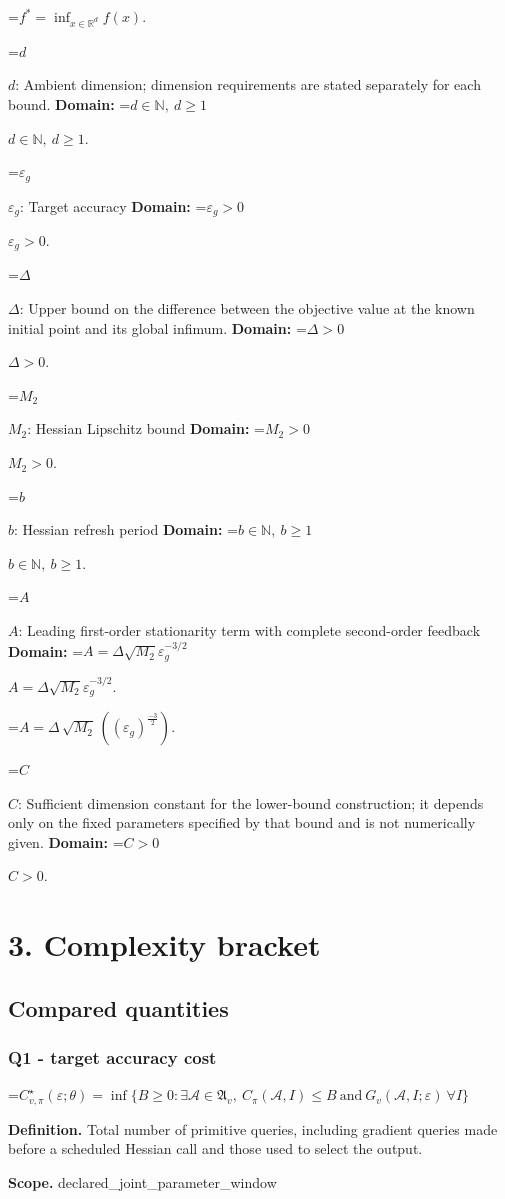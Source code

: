 \documentclass[10pt,a4paper]{article}
\newcommand{\AtlasMath}[1]{\par\begingroup\centering\setbox0=\hbox{$\displaystyle #1$}\ifdim\wd0>1.4\linewidth\typeout{ATLAS WIDE FORMULA: \the\wd0}\fi\ifdim\wd0>\linewidth\resizebox{\linewidth}{!}{\box0}\else\box0\fi\par\endgroup}
\newcommand{\AtlasInlineMath}[1]{\begingroup\setbox0=\hbox{$#1$}\ifdim\wd0>.4\linewidth\endgroup\AtlasMath{#1}\else\endgroup$#1$\fi}
\begin{document}
\AtlasMath{f^*=\inf_{x\in \mathbb{R}^d}f(x).}


\AtlasInlineMath{d}: Ambient dimension; dimension requirements are stated separately for each bound. \textbf{Domain:} \AtlasInlineMath{d\in\mathbb{N},\ d\ge1}.

\AtlasInlineMath{\varepsilon_g}: Target accuracy \textbf{Domain:} \AtlasInlineMath{\varepsilon_g>0}.

\AtlasInlineMath{\Delta}: Upper bound on the difference between the objective value at the known initial point and its global infimum. \textbf{Domain:} \AtlasInlineMath{\Delta>0}.

\AtlasInlineMath{M_2}: Hessian Lipschitz bound \textbf{Domain:} \AtlasInlineMath{M_2>0}.

\AtlasInlineMath{b}: Hessian refresh period \textbf{Domain:} \AtlasInlineMath{b\in\mathbb{N},\ b\ge1}.

\AtlasInlineMath{A}: Leading first-order stationarity term with complete second-order feedback \textbf{Domain:} \AtlasInlineMath{A=\Delta\sqrt{M_2}\varepsilon_g^{-3/2}}.


\AtlasMath{A=\Delta\,\sqrt{M_2}\,((\varepsilon_g)^{\frac{-3}{2}}).}


\AtlasInlineMath{C}: Sufficient dimension constant for the lower-bound construction; it depends only on the fixed parameters specified by that bound and is not numerically given. \textbf{Domain:} \AtlasInlineMath{C>0}.

\section{3. Complexity bracket}
\subsection{Compared quantities}
\subsubsection{Q1 - target accuracy cost}
\AtlasMath{C^\star_{v,\pi}(\varepsilon;\theta)=\inf\{B\ge0:\exists\mathcal A\in\mathfrak A_v,\ C_\pi(\mathcal A,I)\le B\ \text{and}\ G_v(\mathcal A,I;\varepsilon)\ \forall I\}}
\textbf{Definition.} Total number of primitive queries, including gradient queries made before a scheduled Hessian call and those used to select the output.

\textbf{Scope.} declared\_joint\_parameter\_window
\end{document}
